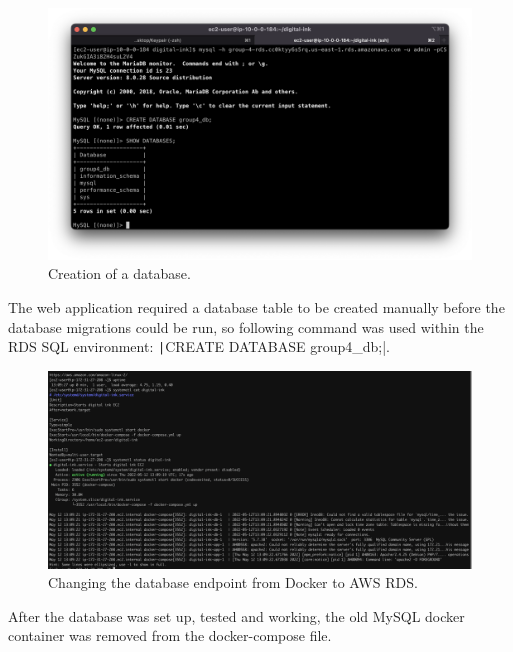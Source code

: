 \begin{figure}[!htbp]
    \centering
    \includegraphics[width=125mm]{resources/rds/rds-database-creation}
    \caption{Creation of a database.}
    \label{fig:rds-db-create-2}
\end{figure}

\clearpage
The web application required a database table to be created manually before the database migrations could be run, so
following command was used within the RDS SQL environment: \texttt|CREATE DATABASE group4_db;|.

\begin{figure}[!htbp]
    \centering
    \includegraphics[width=125mm]{resources/rds/envupdate}
    \caption{Changing the database endpoint from Docker to AWS RDS.}
    \label{fig:rds-env-update}
\end{figure}

After the database was set up, tested and working, the old MySQL docker container was removed from the docker-compose
file.

